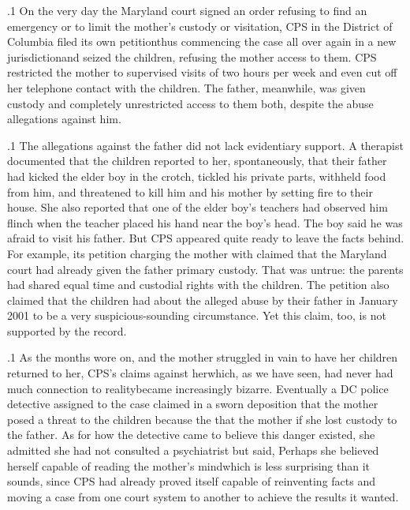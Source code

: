 \documentclass[11pt, twoside]{article}
\begin{document}
{{\begin{itemz}
\end{itemz}

}%

\p.1{%
On the very day the Maryland court signed an order refusing to find
an emergency or to limit the mother's custody or visitation, CPS in the
District of Columbia filed its own petition\mdash{}thus commencing the case
all over again in a new jurisdiction\mdash{}and seized the children, refusing
the mother access to them. CPS restricted the mother to supervised visits of two hours per week and even cut off her telephone contact with
the children. The father, meanwhile, was given custody and completely
unrestricted access to them both, despite the abuse allegations against
him.
}%

\p.1{%
The allegations against the father did not lack evidentiary support. A
therapist documented that the children reported to her, spontaneously,
that their father had kicked the elder boy in the crotch, tickled his private parts, withheld food from him, and threatened to kill him and his
mother by setting fire to their house. She also reported that one of the
elder boy's teachers had observed him flinch when the teacher placed his
hand near the boy's head. The boy said he was afraid to visit his father.
But CPS appeared quite ready to leave the facts behind. For example,
its petition charging the mother with  claimed that the Maryland court had already given the father primary custody. That was
untrue: the parents had shared equal time and custodial rights with
the children. The petition also claimed that the children had  about the alleged abuse by their father in January 2001 to be
\mdash{}a very
suspicious-sounding circumstance. Yet this claim, too, is not supported by the
record.
}%

\p.1{%
As the months wore on, and the mother struggled in vain to have her
children returned to her, CPS's claims against her\mdash{}which, as we have
seen, had never had much connection to reality\mdash{}became increasingly
bizarre. Eventually a DC police detective assigned to the case claimed
in a sworn deposition that the mother posed a threat to the children
because the  that the mother  if she lost custody to the father. As for
how the detective came to believe this
danger existed, she admitted she had not consulted a psychiatrist but
said,  Perhaps
she believed herself capable of reading the mother's mind\mdash{}which is less
surprising than it sounds, since CPS had already proved itself capable of
reinventing facts and moving a case from one court system to another
to achieve the results it wanted.
}%


}
\end{document}
